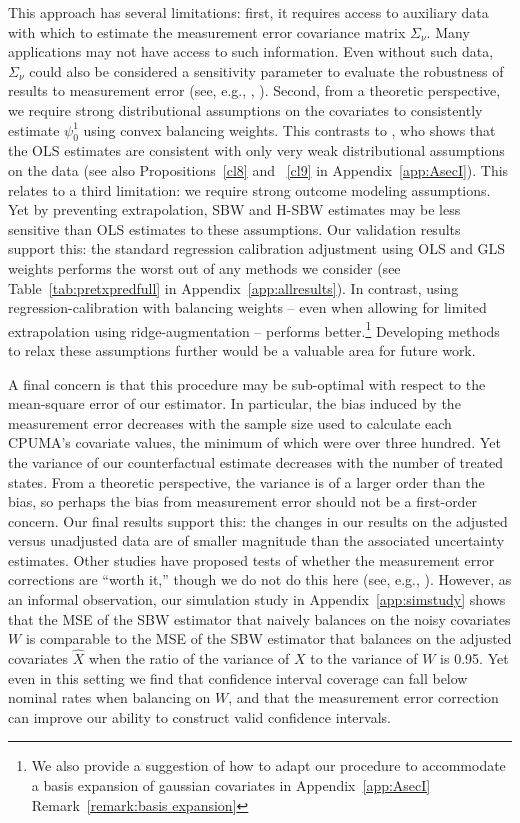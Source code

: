 \documentclass[aoas]{imsart}
\theoremstyle{plain}
\theoremstyle{remark}
\begin{document}
This approach has several limitations: first, it requires access to auxiliary data with which to estimate the measurement error covariance matrix $\Sigma_{\nu}$. Many applications may not have access to such information. Even without such data, $\Sigma_{\nu}$ could also be considered a sensitivity parameter to evaluate the robustness of results to measurement error (see, e.g., \cite{huque2014impact}, \cite{illenberger2020impact}). Second, from a theoretic perspective, we require strong distributional assumptions on the covariates to consistently estimate $\psi_0^1$ using convex balancing weights. This contrasts to \cite{gleser1992importance}, who shows that the OLS estimates are consistent with only very weak distributional assumptions on the data (see also Propositions~\ref{cl8} and ~\ref{cl9} in Appendix~\ref{app:AsecI}). This relates to a third limitation: we require strong outcome modeling assumptions. Yet by preventing extrapolation, SBW and H-SBW estimates may be less sensitive than OLS estimates to these assumptions. Our validation results support this: the standard regression calibration adjustment using OLS and GLS weights performs the worst out of any methods we consider (see Table~\ref{tab:pretxpredfull} in Appendix~\ref{app:allresults}). In contrast, using regression-calibration with balancing weights -- even when allowing for limited extrapolation using ridge-augmentation -- performs better.\footnote{We also provide a suggestion of how to adapt our procedure to accommodate a basis expansion of gaussian covariates in Appendix~\ref{app:AsecI} Remark~\ref{remark:basis expansion}} Developing methods to relax these assumptions further would be a valuable area for future work.

A final concern is that this procedure may be sub-optimal with respect to the mean-square error of our estimator. In particular, the bias induced by the measurement error decreases with the sample size used to calculate each CPUMA's covariate values, the minimum of which were over three hundred. Yet the variance of our counterfactual estimate decreases with the number of treated states. From a theoretic perspective, the variance is of a larger order than the bias, so perhaps the bias from measurement error should not be a first-order concern. Our final results support this: the changes in our results on the adjusted versus unadjusted data are of smaller magnitude than the associated uncertainty estimates. Other studies have proposed tests of whether the measurement error corrections are ``worth it,'' though we do not do this here (see, e.g., \cite{gleser1992importance}). However, as an informal observation, our simulation study in Appendix~\ref{app:simstudy} shows that the MSE of the SBW estimator that naively balances on the noisy covariates $W$ is comparable to the MSE of the SBW estimator that balances on the adjusted covariates $\hat{X}$ when the ratio of the variance of $X$ to the variance of $W$ is 0.95. Yet even in this setting we find that confidence interval coverage can fall below nominal rates when balancing on $W$, and that the measurement error correction can improve our ability to construct valid confidence intervals.
\end{document}
